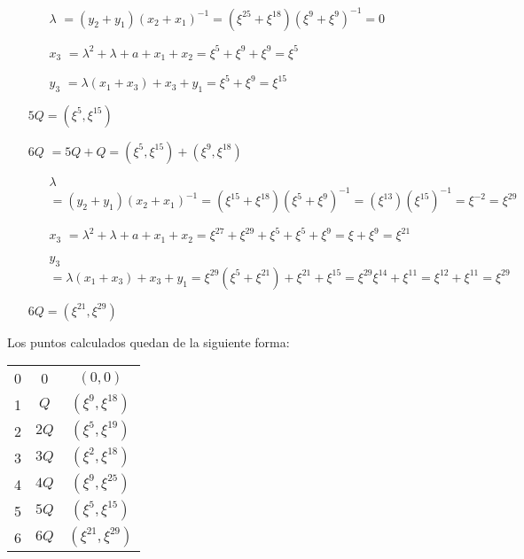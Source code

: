 \documentclass[fleqn]{article}
\begin{document}
\begin{itemize}
            \begin{itemize}
                \item[$\lambda$] $ = (y_2 + y_1)(x_2 + x_1)^{-1} = (\xi^{25} + \xi^{18})(\xi^{9} + \xi^{9})^{-1}  = 0$
                \item[$x_3$] $ = \lambda^2 + \lambda + a + x_1 + x_2 = \xi^{5} + \xi^{9} + \xi^{9} = \xi^{5}$
                \item[$y_3$] $ = \lambda(x_1 + x_3) + x_3 + y_1 = \xi^{5} + \xi^{9} = \xi^{15}$
            \end{itemize}
            $5Q = (\xi^{5}, \xi^{15})$
        \item[$6Q$] $ = 5Q + Q = (\xi^{5}, \xi^{15}) + (\xi^9, \xi^{18})$
            \begin{itemize}
                \item[$\lambda$] $ = (y_2 + y_1)(x_2 + x_1)^{-1} = (\xi^{15} + \xi^{18})(\xi^{5} + \xi^{9})^{-1} = (\xi^{13})(\xi^{15})^{-1} = \xi^{-2} = \xi^{29}$
                \item[$x_3$] $ = \lambda^2 + \lambda + a + x_1 + x_2 = \xi^{27} + \xi^{29} + \xi^{5} + \xi^{5} + \xi^{9} = \xi + \xi^{9} = \xi^{21}$
                \item[$y_3$] $ = \lambda(x_1 + x_3) + x_3 + y_1 = \xi^{29} (\xi^{5} + \xi^{21}) + \xi^{21} + \xi^{15} = \xi^{29} \xi^{14} + \xi^{11} = \xi^{12} + \xi^{11} = \xi^{29}$
            \end{itemize}
            $6Q = (\xi^{21}, \xi^{29})$
    \end{itemize}

    Los puntos calculados quedan de la siguiente forma: 
    \begin{center}
        \begin{tabular}{| c | c | c |}
            \hline
            0 & 0 & $(0,0)$\\
            1 & $Q$ & $(\xi^9, \xi^{18})$\\
            2 & $2Q$ & $(\xi^{5}, \xi^{19})$\\
            3 & $3Q$ & $(\xi^{2}, \xi^{18})$\\
            4 & $4Q$ & $(\xi^{9}, \xi^{25})$\\
            5 & $5Q$ & $(\xi^{5}, \xi^{15})$\\
            6 & $6Q$ & $(\xi^{21}, \xi^{29})$\\ \hline
        \end{tabular}
    \end{center}
\end{document}
